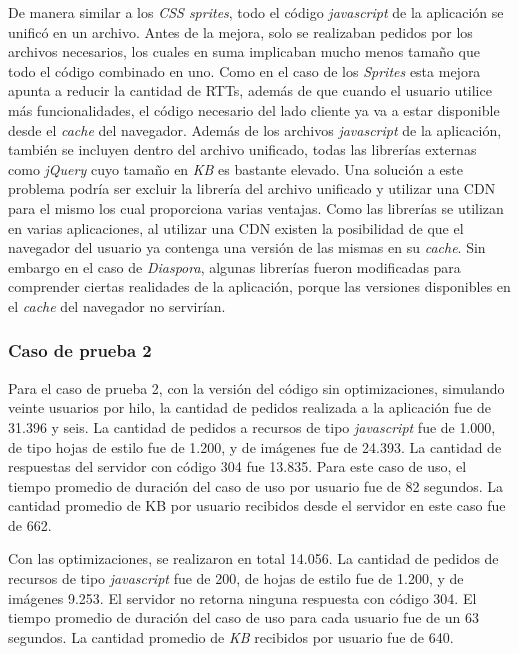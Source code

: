 De manera similar a los \emph{CSS sprites}, todo el código \emph{javascript} de la aplicación se unificó en un archivo. Antes de la mejora, solo se realizaban pedidos por los archivos 
necesarios, los cuales en suma implicaban mucho menos tamaño que todo el código combinado en uno. Como en el caso de los \emph{Sprites} esta mejora apunta a reducir la 
cantidad de RTTs, además de que cuando el usuario utilice más funcionalidades, el código necesario del lado cliente ya va a estar disponible desde el \emph{cache} del navegador.
Además de los archivos \emph{javascript} de la aplicación, también se incluyen dentro del archivo unificado, todas las librerías externas como \emph{jQuery} cuyo tamaño en
\emph{KB} es bastante elevado. Una solución a este problema podría ser excluir la librería del archivo unificado y utilizar una CDN para el mismo los cual proporciona varias
ventajas. Como las librerías se utilizan en varias aplicaciones, al utilizar una CDN existen la posibilidad de que el navegador del usuario ya contenga una versión de las mismas en su 
\emph{cache}. Sin embargo en el caso de \emph{Diaspora}, algunas librerías fueron modificadas para comprender ciertas realidades de la aplicación, porque las versiones
disponibles en el \emph{cache} del navegador no servirían.

\subsubsection{Caso de prueba 2}

Para el caso de prueba 2, con la versión del código sin optimizaciones, simulando veinte usuarios por hilo, la cantidad de pedidos realizada a la aplicación fue de 31.396 y seis.
La cantidad de pedidos a recursos de tipo \emph{javascript} fue de 1.000, de tipo hojas de estilo fue de 1.200, y de
imágenes fue de 24.393. La cantidad de respuestas del servidor con código 304 fue 13.835. Para este caso de uso, el
tiempo promedio de duración del caso de uso por usuario fue de 82 segundos. La cantidad promedio de KB por usuario recibidos desde el servidor
en este caso fue de 662.

Con las optimizaciones, se realizaron en total 14.056. La cantidad de pedidos de recursos de tipo \emph{javascript} fue de 200, de hojas
de estilo fue de 1.200, y de imágenes 9.253. El servidor no retorna ninguna respuesta con código 304. El tiempo promedio de duración
del caso de uso para cada usuario fue de un 63 segundos. La cantidad promedio de \emph{KB} recibidos por usuario fue de 640.


